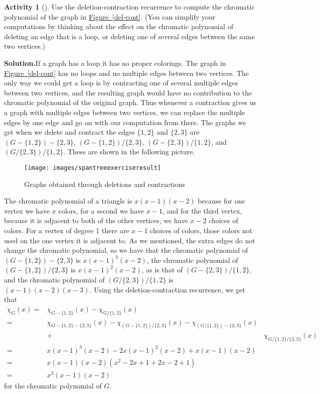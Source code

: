 \documentclass[10pt,]{book}
\theoremstyle{plain}
\theoremstyle{definition}
\newtheorem{activity}[project]{Activity}
\numberwithin{equation}{chapter}
\newcommand{\amp}{&}
\begin{document}
\begin{activity}[]\label{activity-237}
Use the deletion-contraction recurrence to compute the chromatic polynomial of the graph in \hyperref[del-cont]{Figure~\ref{del-cont}}. (You can simplify your computations by thinking about the effect on the chromatic polynomial of deleting an edge that is a loop, or deleting one of several edges between the same two vertices.)%
\par\medskip\noindent%
\textbf{Solution.}\quad If a graph has a loop it has no proper colorings. The graph in \hyperref[del-cont]{Figure~\ref{del-cont}} has no loops and no multiple edges between two vertices. The only way we could get a loop is by contracting one of several multiple edges between two vertices, and the resulting graph would have no contribution to the chromatic polynomial of the original graph. Thus whenever a contraction gives us a graph with multiple edges between two vertices, we can replace the multiple edges by one edge and go on with our computation from there. The graphs we get when we delete and contract the edges \(\{1,2\}\) and \(\{2,3\}\) are \((G-\{1,2\})-\{2,3\}\), \((G-\{1,2\})/\{2,3\}\), \((G-\{2,3\})/\{1,2\}\), and \((G/\{2,3\})/\{1,2\}\). These are shown in the following picture.%
\begin{figure}
\centering
\texttt{[image: images/spantreeexerciseresult]}
\caption{Graphs obtained through deletions and contractions\label{delete-contract}}
\end{figure}
The chromatic polynomial of a triangle is \(x(x-1)(x-2)\) because for one vertex we have \(x\) colors, for a second we have \(x-1\), and for the third vertex, because it is adjacent to both of the other vertices, we have \(x-2\) choices of colors. For a vertex of degree 1 there are \(x-1\) choices of colors, those colors not used on the one vertex it is adjacent to. As we mentioned, the extra edges do not change the chromatic polynomial, so we have that the chromatic polynomial of \((G-\{1,2\})-\{2,3\}\) is \(x(x-1)^3(x-2)\), the chromatic polynomial of \((G-\{1,2\})/\{2,3\}\) is \(x(x-1)^2(x-2)\), as is that of \((G-\{2,3\})/\{1,2\}\), and the chromatic polynomial of \((G/\{2,3\})/\{1,2\}\) is \((x-1)(x-2)(x-3)\). Using the deletion-contraction recurrence, we get that%
\begin{align*}
\chi_G(x)  =\amp  \chi_{G-\{1,2\}}(x) - \chi_{G/\{1,2\}}(x)\\
=\amp
\chi_{G-\{1,2\}-\{2,3\}}(x)-\chi_{(G-\{1,2\})/\{2,3\}}(x)-
\chi_{(G/\{1,2\})-\{2,3\}}(x)\\
\amp +\amp  \chi_{G/\{1,2\}/\{2,3\}}(x)\\
=\amp  x(x-1)^3(x-2)-2x(x-1)^2(x-2) + x(x-1)(x-2)\\
=\amp  x(x-1)(x-2)(x^2-2x+1 +2x-2 +1)\\
=\amp  x^3(x-1)(x-2)
\end{align*}
for the chromatic polynomial of \(G\).%
\end{activity}
\end{document}
